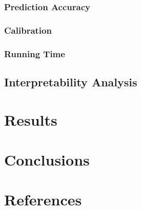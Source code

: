 \documentclass[
  a4paper,
]{scrreprt}
\begin{document}
\subsection{Prediction Accuracy}\label{prediction-accuracy}

\subsection{Calibration}\label{calibration}

\subsection{Running Time}\label{running-time}

\section{Interpretability Analysis}\label{interpretability-analysis}


\chapter{Results}\label{results}


\chapter{Conclusions}\label{conclusions}


\chapter*{References}\label{references}

\end{document}

